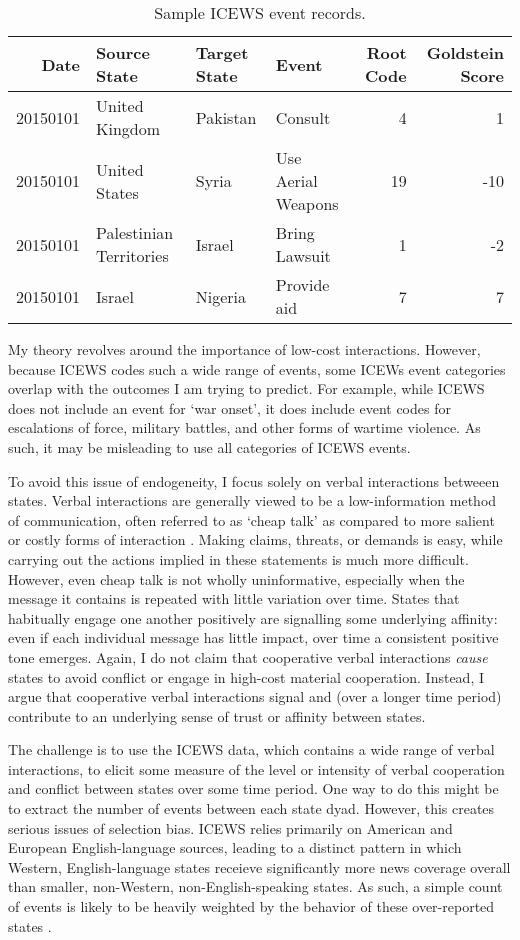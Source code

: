 \documentclass[10pt,]{article}
\begin{document}
\begin{table}

\caption{\label{tab:ICEWSEvents}Sample ICEWS event records.}
\centering
\begin{tabular}[t]{rlllrr}
\toprule
Date & Source State & Target State & Event & Root Code & Goldstein Score\\
\midrule
20150101 & United Kingdom & Pakistan & Consult & 4 & 1\\
20150101 & United States & Syria & Use Aerial Weapons & 19 & -10\\
20150101 & Palestinian Territories & Israel & Bring Lawsuit & 1 & -2\\
20150101 & Israel & Nigeria & Provide aid & 7 & 7\\
\bottomrule
\end{tabular}
\end{table}

My theory revolves around the importance of low-cost interactions.
However, because ICEWS codes such a wide range of events, some ICEWs
event categories overlap with the outcomes I am trying to predict. For
example, while ICEWS does not include an event for `war onset', it does
include event codes for escalations of force, military battles, and
other forms of wartime violence. As such, it may be misleading to use
all categories of ICEWS events.

To avoid this issue of endogeneity, I focus solely on verbal
interactions betweeen states. Verbal interactions are generally viewed
to be a low-information method of communication, often referred to as
`cheap talk' as compared to more salient or costly forms of interaction
\citetext{\citealp[e.g.][274-275]{Fearon1998b}; \citealp[599]{Kydd2003}}.
Making claims, threats, or demands is easy, while carrying out the
actions implied in these statements is much more difficult. However,
even cheap talk is not wholly uninformative, especially when the message
it contains is repeated with little variation over time. States that
habitually engage one another positively are signalling some underlying
affinity: even if each individual message has little impact, over time a
consistent positive tone emerges. Again, I do not claim that cooperative
verbal interactions \emph{cause} states to avoid conflict or engage in
high-cost material cooperation. Instead, I argue that cooperative verbal
interactions signal and (over a longer time period) contribute to an
underlying sense of trust or affinity between states.

The challenge is to use the ICEWS data, which contains a wide range of
verbal interactions, to elicit some measure of the level or intensity of
verbal cooperation and conflict between states over some time period.
One way to do this might be to extract the number of events between each
state dyad. However, this creates serious issues of selection bias.
ICEWS relies primarily on American and European English-language
sources, leading to a distinct pattern in which Western,
English-language states receieve significantly more news coverage
overall than smaller, non-Western, non-English-speaking states. As such,
a simple count of events is likely to be heavily weighted by the
behavior of these over-reported states \citep{Barnett2013}.
\end{document}
